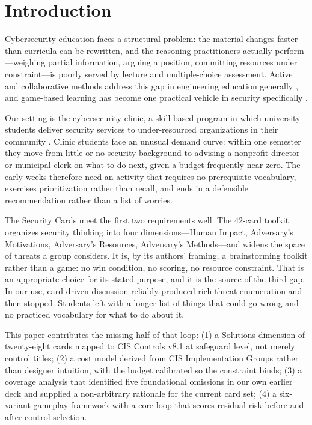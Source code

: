 \documentclass[10pt,twocolumn,letterpaper]{article}
\begin{document}
\section{Introduction}

Cybersecurity education faces a structural problem: the material changes faster
than curricula can be rewritten, and the reasoning practitioners actually
perform---weighing partial information, arguing a position, committing resources
under constraint---is poorly served by lecture and multiple-choice assessment.
Active and collaborative methods address this gap in engineering education
generally \cite{prince2004active}, and game-based learning has become one
practical vehicle in security specifically \cite{plass2015gbl,wouters2013meta}.

Our setting is the cybersecurity clinic, a skill-based program in which
university students deliver security services to under-resourced organizations
in their community \cite{clinics_consortium}. Clinic students face an unusual
demand curve: within one semester they move from little or no security
background to advising a nonprofit director or municipal clerk on what to do
next, given a budget frequently near zero. The early weeks therefore need an
activity that requires no prerequisite vocabulary, exercises prioritization
rather than recall, and ends in a defensible recommendation rather than a list
of worries.

The Security Cards \cite{denning2013securitycards} meet the first two
requirements well. The 42-card toolkit organizes security thinking into four
dimensions---Human Impact, Adversary's Motivations, Adversary's Resources,
Adversary's Methods---and widens the space of threats a group considers. It is,
by its authors' framing, a brainstorming toolkit rather than a game: no win
condition, no scoring, no resource constraint. That is an appropriate choice for
its stated purpose, and it is the source of the third gap. In our use,
card-driven discussion reliably produced rich threat enumeration and then
stopped. Students left with a longer list of things that could go wrong and no
practiced vocabulary for what to do about it.

This paper contributes the missing half of that loop: (1) a Solutions dimension
of twenty-eight cards mapped to CIS Controls v8.1 \cite{cis2024controls} at
safeguard level, not merely control titles; (2) a cost model derived from CIS
Implementation Groups \cite{cis_ig} rather than designer intuition, with the
budget calibrated so the constraint binds; (3) a coverage analysis that
identified five foundational omissions in our own earlier deck and supplied a
non-arbitrary rationale for the current card set; (4) a six-variant gameplay
framework with a core loop that scores residual risk before and after control
selection.
\end{document}
